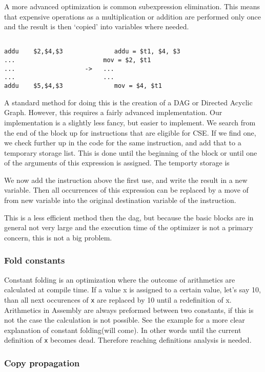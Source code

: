\documentclass[10pt,a4paper]{article}
\begin{document}
A more advanced optimization is common subexpression elimination. This means
that expensive operations as a multiplication or addition are performed only
once and the result is then `copied' into variables where needed.
\begin{verbatim}

addu	$2,$4,$3              addu = $t1, $4, $3
...                        mov = $2, $t1
...                   ->   ...
...                        ...
addu	$5,$4,$3              mov = $4, $t1

\end{verbatim}

A standard method for doing this is the creation of a DAG or Directed Acyclic
Graph. However, this requires a fairly advanced implementation. Our
implementation is a slightly less fancy, but easier to implement.
We search from the end of the block up for instructions that are eligible for
CSE. If we find one, we check further up in the code for the same instruction,
and add that to a temporary storage list. This is done until the beginning of
the block or until one of the arguments of this expression is assigned. The temporty storage is 

We now add the instruction above the first use, and write the result in a new
variable. Then all occurrences of this expression can be replaced by a move of
from new variable into the original destination variable of the instruction.

This is a less efficient method then the dag, but because the basic blocks are
in general not very large and the execution time of the optimizer is not a
primary concern, this is not a big problem.

\subsubsection*{Fold constants}
Constant folding is an optimization where the outcome of arithmetics are calculated at compile time. If a value x is assigned to a certain value, let's say 10, than all next occurences of \texttt{x} are replaced by 10 until a redefinition of x. Arithmetics in Assembly are always preformed between two constants, if this is not the case the calculation is not possible. See the example for a more clear explanation of constant folding(will come). In other words until the current definition of \texttt{x} becomes dead. Therefore reaching definitions analysis is needed.



\subsubsection*{Copy propagation}
\end{document}
